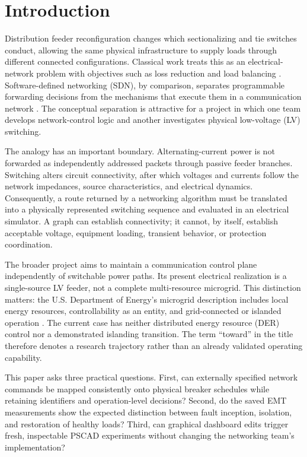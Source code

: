 \section{Introduction}
Distribution feeder reconfiguration changes which sectionalizing and tie
switches conduct, allowing the same physical infrastructure to supply loads
through different connected configurations. Classical work treats this as an
electrical-network problem with objectives such as loss reduction and load
balancing \cite{baran1989}. Software-defined networking (SDN), by comparison,
separates programmable forwarding decisions from the mechanisms that execute
them in a communication network \cite{mckeown2008}. The conceptual separation
is attractive for a project in which one team develops network-control logic
and another investigates physical low-voltage (LV) switching.

The analogy has an important boundary. Alternating-current power is not
forwarded as independently addressed packets through passive feeder branches.
Switching alters circuit connectivity, after which voltages and currents follow
the network impedances, source characteristics, and electrical dynamics.
Consequently, a route returned by a networking algorithm must be translated
into a physically represented switching sequence and evaluated in an
electrical simulator. A graph can establish connectivity; it cannot, by
itself, establish acceptable voltage, equipment loading, transient behavior,
or protection coordination.

The broader project aims to maintain a communication control plane independently
of switchable power paths. Its present electrical realization is a single-source
LV feeder, not a complete multi-resource microgrid. This distinction matters:
the U.S. Department of Energy's microgrid description includes local energy
resources, controllability as an entity, and grid-connected or islanded
operation \cite{doeMicrogrids}. The current case has neither distributed
energy resource (DER) control nor a demonstrated islanding transition. The
term ``toward'' in the title therefore denotes a research trajectory rather
than an already validated operating capability.

This paper asks three practical questions. First, can externally specified
network commands be mapped consistently onto physical breaker schedules while
retaining identifiers and operation-level decisions? Second, do the saved EMT
measurements show the expected distinction between fault inception, isolation,
and restoration of healthy loads? Third, can graphical dashboard edits trigger
fresh, inspectable PSCAD experiments without changing the networking team's
implementation?

